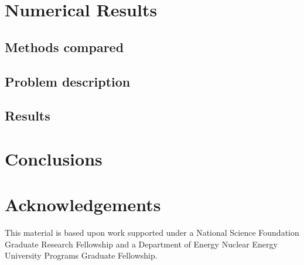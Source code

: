 \documentclass[11pt,letter,twoside]{mc2011}
\begin{document}
\section{Numerical Results}

\subsection{Methods compared}
\subsection{Problem description}
\subsection{Results}

\section{Conclusions}


\section*{Acknowledgements}
This material is based upon work supported under a National Science Foundation
Graduate Research Fellowship and a Department of Energy Nuclear
Energy University Programs Graduate Fellowship.

\nocite{Mih1984}



\end{document}
